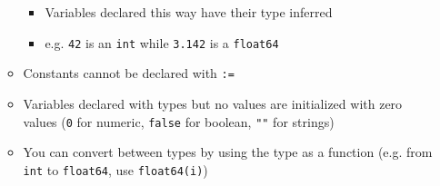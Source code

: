 \documentclass[11pt, oneside]{article}   	%
\begin{document}
\begin{itemize}
\begin{itemize}
          \begin{itemize}
            \item Variables declared this way have their type inferred
            \item e.g. \texttt{42} is an \texttt{int} while \texttt{3.142} is a \texttt{float64}
          \end{itemize}
        \item Constants cannot be declared with \texttt{:=}
        \item Variables declared with types but no values are initialized with zero values (\texttt{0} for numeric, \texttt{false} for boolean, \texttt{""} for strings)
        \item You can convert between types by using the type as a function (e.g. from \texttt{int} to \texttt{float64}, use \texttt{float64(i)})
      \end{itemize}
  \end{itemize}
\end{document}
